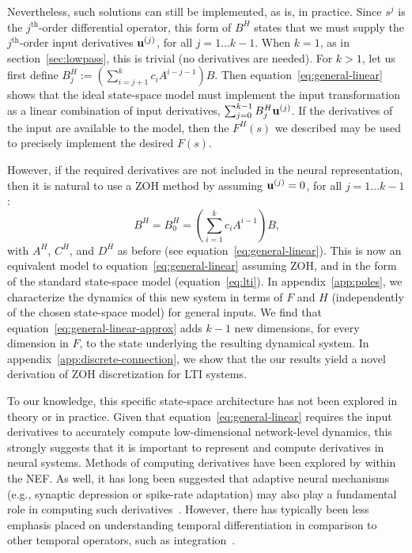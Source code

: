 Nevertheless, such solutions can still be implemented, as is, in practice.
Since $s^j$ is the $j^{\text{th}}$-order differential operator, this form of $B^H$ states that we must supply the $j^{\text{th}}$-order input derivatives $\mathbf{u}^{(j)}$, for all $j = 1 \ldots k - 1$.
When $k = 1$, as in section~\ref{sec:lowpass}, this is trivial (no derivatives are needed).
For $k > 1$, let us first define $B^H_j:= \left( \sum_{i=j+1}^k c_i A^{i-j-1} \right) B$.
Then equation~\ref{eq:general-linear} shows that the ideal state-space model must implement the input transformation as a linear combination of input derivatives, $\sum_{j=0}^{k-1} B^H_j \mathbf{u}^{(j)}$.
If the derivatives of the input are available to the model, then the $F^{H}(s)$ we described may be used to precisely implement the desired $F(s)$.

However, if the required derivatives are not included in the neural representation, then it is natural to use a ZOH method by assuming $\mathbf{u}^{(j)} = 0$, for all $j = 1 \ldots k - 1$:
\begin{equation} \label{eq:general-linear-approx}
B^H = B^H_0 =  \left( \sum_{i=1}^k c_i A^{i-1} \right) B \text{,}
\end{equation}
with $A^H$, $C^H$, and $D^H$ as before (see equation~\ref{eq:general-linear}).
This is now an equivalent model to equation~\ref{eq:general-linear} assuming ZOH, and in the form of the standard state-space model (equation~\ref{eq:lti}).
In appendix~\ref{app:poles}, we characterize the dynamics of this new system in terms of $F$ and $H$ (independently of the chosen state-space model) for general inputs.
We find that equation~\ref{eq:general-linear-approx} adds $k - 1$ new dimensions, for every dimension in $F$, to the state underlying the resulting dynamical system.
In appendix~\ref{app:discrete-connection}, we show that the our results yield a novel derivation of ZOH discretization for LTI systems.

To our knowledge, this specific state-space architecture has not been explored in theory or in practice.
Given that equation~\ref{eq:general-linear} requires the input derivatives to accurately compute low-dimensional network-level dynamics, this strongly suggests that it is important to represent and compute derivatives in neural systems.
Methods of computing derivatives have been explored by \citet{tripp2010} within the NEF.
As well, it has long been suggested that adaptive neural mechanisms (e.g., synaptic depression or spike-rate adaptation) may also play a fundamental role in computing such derivatives~\citep{abbott2004synaptic, lundstrom2008fractional}.
However, there has typically been less emphasis placed on understanding temporal differentiation in comparison to other temporal operators, such as integration~\citep{tripp2010}.

